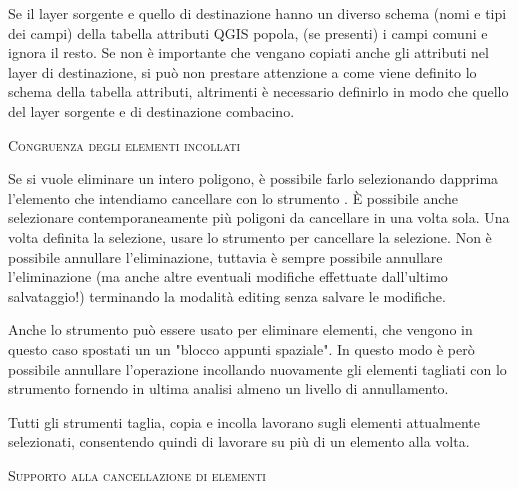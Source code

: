 Se il layer sorgente e quello di destinazione hanno un diverso schema (nomi e
tipi dei campi) della
tabella attributi QGIS popola, (se presenti) i campi comuni e ignora il resto.
Se non è importante che vengano copiati anche gli attributi nel layer di
destinazione, si può non prestare attenzione a come viene definito lo schema
della tabella attributi, altrimenti è necessario definirlo in modo che quello
del layer sorgente e di destinazione combacino.

\begin{Tip}[ht]\caption{\textsc{Congruenza degli elementi incollati}}
\end{Tip}


Se si vuole eliminare un intero poligono, è possibile farlo selezionando
dapprima l'elemento che intendiamo cancellare con lo strumento
. È possibile anche selezionare
contemporaneamente più poligoni da cancellare in una volta sola. Una volta
definita la selezione, usare lo strumento
 per cancellare la
selezione. Non è possibile annullare l'eliminazione, tuttavia è sempre
possibile annullare l'eliminazione (ma anche altre eventuali modifiche
effettuate dall'ultimo salvataggio!) terminando la modalità editing senza
salvare le modifiche.

Anche lo strumento  può essere
usato per eliminare elementi, che vengono in questo caso spostati un un
"blocco appunti spaziale". In questo modo è però possibile annullare
l'operazione incollando nuovamente gli elementi tagliati con lo strumento
 fornendo in ultima
analisi almeno un livello di annullamento.

Tutti gli strumenti taglia, copia e incolla lavorano sugli elementi
attualmente selezionati, consentendo quindi di lavorare su più di un elemento
alla volta.

\begin{Tip}[ht]\caption{\textsc{Supporto alla cancellazione di elementi}}
\end{Tip}

